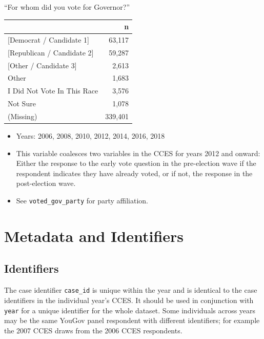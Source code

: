 \documentclass[10pt,article,oneside]{memoir}
\theoremstyle{definition}
\begin{document}
``For whom did you vote for Governor?''

\begin{table}[H]
\centering
\begin{tabular}{lr}
\toprule
 & n\\
\midrule
{[Democrat / Candidate 1]} & 63,117\\
{[Republican / Candidate 2]} & 59,287\\
{[Other / Candidate 3]} & 2,613\\
Other & 1,683\\
I Did Not Vote In This Race & 3,576\\
Not Sure & 1,078\\
(Missing) & 339,401\\
\bottomrule
\end{tabular}
\end{table}

\begin{itemize}
\tightlist
\item
  Years: 2006, 2008, 2010, 2012, 2014, 2016, 2018
\item
  This variable coalesces two variables in the CCES for years 2012 and
  onward: Either the response to the early vote question in the
  pre-election wave if the respondent indicates they have already voted,
  or if not, the response in the post-election wave.
\item
  See \texttt{voted\_gov\_party} for party affiliation.
\end{itemize}

\newpage

\hypertarget{metadata-and-identifiers}{%
\section{Metadata and Identifiers}\label{metadata-and-identifiers}}

\hypertarget{identifiers}{%
\subsection{Identifiers}\label{identifiers}}

The case identifier \texttt{case\_id} is unique within the year and is
identical to the case identifiers in the individual year's CCES. It
should be used in conjunction with \texttt{year} for a unique identifier
for the whole dataset. Some individuals across years may be the same
YouGov panel respondent with different identifiers; for example the 2007
CCES draws from the 2006 CCES respondents.
\end{document}
